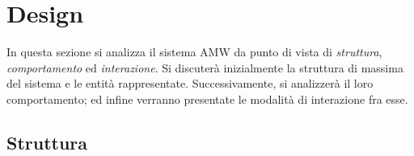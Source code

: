\section{Design}




In questa sezione si analizza il sistema AMW da punto di vista di \textit{struttura}, \textit{comportamento} ed \textit{interazione}.
Si discuterà inizialmente la struttura di massima del sistema e le entità rappresentate. Successivamente, si analizzerà il loro comportamento; ed infine verranno presentate le modalità di interazione fra esse.

\subsection{Struttura}



